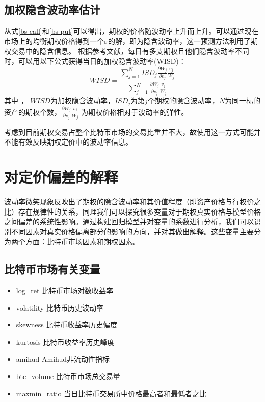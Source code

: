     \subsection{加权隐含波动率估计}
    从式\ref{bs-call}和\ref{bs-put}可以得出，期权的价格随波动率上升而上升。可以通过现在市场上的均衡期权价格得到一个$\sigma$的解，即为隐含波动率，这一预测方法利用了期权交易中的隐含信息。
    根据参考文献\cite{CHIRAS1978213}，每日有多支期权且他们隐含波动率不同时，可以用以下公式获得当日的加权隐含波动率(WISD)：
    \begin{equation}
        WISD=\frac{\sum_{j=1}^{N}{ISD_j\frac{\partial{W_j}}{\partial{v_j}}\frac{v_j}{W_j}}}{\sum_{j=1}^{N}{\frac{\partial{W_j}}{\partial{v_j}}\frac{v_j}{W_j}}}
    \end{equation}
    其中 ， $WISD$为加权隐含波动率，$ISD_j$为第$j$个期权的隐含波动率，$N$为同一标的资产的期权个数，$\frac{\partial{W_j}}{\partial{v_j}}\frac{v_j}{W_j}$ 为期权价格相对于波动率的弹性。
    \par{考虑到目前期权交易占整个比特币市场的交易比重并不大，故使用这一方式可能并不能有效反映期权定价中的波动率信息。}
    \section{对定价偏差的解释}\label{reg vars}
    波动率微笑现象反映出了期权的隐含波动率和其价值程度（即资产价格与行权价之比）存在规律性的关系，同理我们可以探究很多变量对于期权真实价格与模型价格之间偏差的系统性影响。通过构建回归模型并对变量的系数进行分析，我们可以识别不同因素对真实价格偏离部分的影响的方向，并对其做出解释。这些变量主要分为两个方面：比特币市场因素和期权因素。
    \subsection{比特币市场有关变量}
    \begin{itemize}
        \item log\_ret 比特币市场对数收益率
        \item volatility 比特币历史波动率
        \item skewness 比特币收益率历史偏度
        \item kurtosis 比特币收益率历史峰度
        \item amihud Amihud非流动性指标
        \item btc\_volume 比特币市场总交易量
        \item maxmin\_ratio 当日比特币交易所中价格最高者和最低者之比
    \end{itemize}
    
